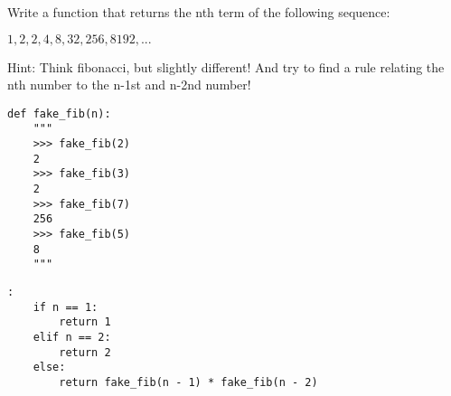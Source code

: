 \begin{blocksection}
\question Write a function that returns the nth term of the following sequence:

$1, 2, 2, 4, 8, 32, 256, 8192, ...$

Hint: Think fibonacci, but slightly different! And try to find a rule relating the nth number to the n-1st and n-2nd number!

\begin{lstlisting}
def fake_fib(n):
    """
    >>> fake_fib(2)
    2
    >>> fake_fib(3)
    2
    >>> fake_fib(7)
    256
    >>> fake_fib(5)
    8
    """
\end{lstlisting}

\begin{solution}[1in]
\begin{lstlisting}:
    if n == 1:
        return 1
    elif n == 2:
        return 2
    else:
        return fake_fib(n - 1) * fake_fib(n - 2)
\end{lstlisting}
\end{solution}
\end{blocksection}
